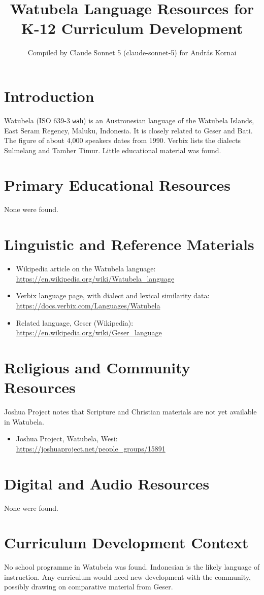 \documentclass[12pt]{article}
\title{Watubela Language Resources for K-12 Curriculum Development}
\author{Compiled by Claude Sonnet 5 (claude-sonnet-5) for Andr\'as Kornai}
\date{}
\begin{document}
\maketitle

\section{Introduction}
Watubela (ISO 639-3 \texttt{wah}) is an Austronesian language of the Watubela Islands, East Seram Regency, Maluku, Indonesia. It is closely related to Geser and Bati. The figure of about 4,000 speakers dates from 1990. Verbix lists the dialects Sulmelang and Tamher Timur. Little educational material was found.

\section{Primary Educational Resources}
None were found.

\section{Linguistic and Reference Materials}
\begin{itemize}
\item Wikipedia article on the Watubela language: \url{https://en.wikipedia.org/wiki/Watubela_language}
\item Verbix language page, with dialect and lexical similarity data: \url{https://docs.verbix.com/Languages/Watubela}
\item Related language, Geser (Wikipedia): \url{https://en.wikipedia.org/wiki/Geser_language}
\end{itemize}

\section{Religious and Community Resources}
Joshua Project notes that Scripture and Christian materials are not yet available in Watubela.
\begin{itemize}
\item Joshua Project, Watubela, Wesi: \url{https://joshuaproject.net/people_groups/15891}
\end{itemize}

\section{Digital and Audio Resources}
None were found.

\section{Curriculum Development Context}
No school programme in Watubela was found. Indonesian is the likely language of instruction. Any curriculum would need new development with the community, possibly drawing on comparative material from Geser.
\end{document}
